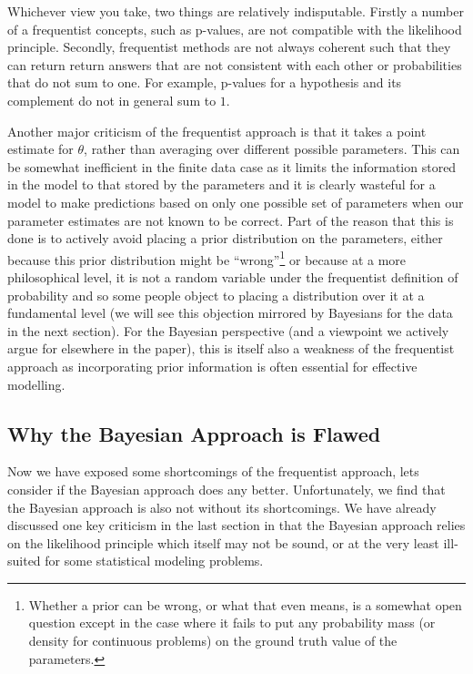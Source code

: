 Whichever view you take, two things are relatively indisputable.  Firstly a number of a frequentist concepts, such as p-values,
are not compatible with the likelihood principle.  Secondly, frequentist methods are not always coherent such that they can
return return answers that are not consistent with each other or probabilities that do not sum to one.  For example, p-values
for a hypothesis and its complement do not in general sum to $1$.  

Another major criticism of the frequentist approach is that it takes a point estimate for $\theta$, rather than averaging
over different possible parameters.  This can be somewhat inefficient in the finite data case as it limits the information
stored in the model to that stored by the parameters and it is clearly wasteful for a model to make predictions based on
only one possible set of parameters when our parameter estimates are not known to be correct.  Part of the reason that this
is done is to actively avoid placing a prior distribution on the parameters, either because this prior distribution might
be ``wrong''\footnote{Whether a prior can be wrong, or what that even means, is a somewhat open question except in the
	case where it fails to put any probability mass (or density for continuous problems) on the ground truth value of
	the parameters.} or because at a more philosophical level, it is not a random variable under the frequentist definition
of probability and so some people object to placing a distribution over it at a fundamental level (we will see this objection
mirrored by Bayesians for the data in the next section).  For the Bayesian perspective (and a viewpoint we actively 
argue for elsewhere in the paper), this is itself also a weakness of the frequentist approach as incorporating prior
information is often essential for effective modelling.


\subsection{Why the Bayesian Approach is Flawed}
\label{sec:bayes:religion:bayes}

Now we have exposed some shortcomings of the frequentist approach, lets consider if the Bayesian approach does any better.
Unfortunately, we find that the Bayesian approach is also not without its shortcomings.  We have already discussed one
key criticism in the last section in that the Bayesian approach relies on the likelihood principle which itself may not
be sound, or at the very least ill-suited for some statistical modeling problems.

